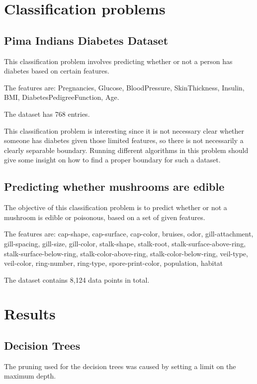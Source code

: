 \documentclass[11pt]{article}
\begin{document}
        \section{Classification problems}
            \subsection{Pima Indians Diabetes Dataset}

            This classification problem involves predicting whether or not a person has diabetes
            based on certain features.

            The features are: Pregnancies, Glucose, BloodPressure, SkinThickness, Insulin, BMI, DiabetesPedigreeFunction, Age.

            The dataset has 768 entries.

            This classification problem is interesting since it is not necessary
            clear whether someone has diabetes given those limited features, so there
            is not necessarily a clearly separable boundary. Running different algorithms
            in this problem should give some insight on how to find a proper boundary for
            such a dataset.

            \subsection{Predicting whether mushrooms are edible}

            The objective of this classification problem is to predict
            whether or not a mushroom is edible or poisonous, based on a set
            of given features.

            The features are: cap-shape, cap-surface, cap-color, bruises, odor, gill-attachment, gill-spacing, gill-size, gill-color, stalk-shape, stalk-root, stalk-surface-above-ring, stalk-surface-below-ring, stalk-color-above-ring, stalk-color-below-ring, veil-type, veil-color, ring-number, ring-type, spore-print-color, population, habitat

            The dataset contains 8,124 data points in total.


        
        \section{Results}

        \subsection{Decision Trees}
        The pruning used for the decision trees was caused by setting a limit on the maximum depth.
\end{document}
